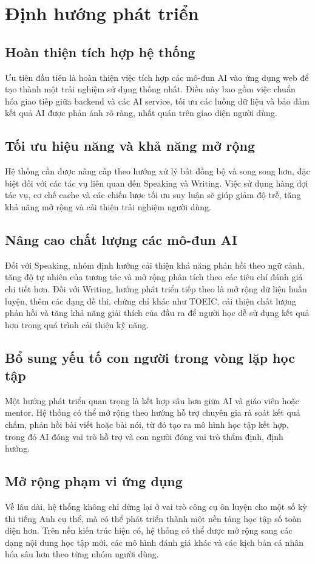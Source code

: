 \section{Định hướng phát triển}

\subsection{Hoàn thiện tích hợp hệ thống}
Ưu tiên đầu tiên là hoàn thiện việc tích hợp các mô-đun AI vào ứng dụng web để tạo thành một trải nghiệm sử dụng thống nhất. Điều này bao gồm việc chuẩn hóa giao tiếp giữa backend và các AI service, tối ưu các luồng dữ liệu và bảo đảm kết quả AI được phản ánh rõ ràng, nhất quán trên giao diện người dùng.

\subsection{Tối ưu hiệu năng và khả năng mở rộng}
Hệ thống cần được nâng cấp theo hướng xử lý bất đồng bộ và song song hơn, đặc biệt đối với các tác vụ liên quan đến Speaking và Writing. Việc sử dụng hàng đợi tác vụ, cơ chế cache và các chiến lược tối ưu suy luận sẽ giúp giảm độ trễ, tăng khả năng mở rộng và cải thiện trải nghiệm người dùng.

\subsection{Nâng cao chất lượng các mô-đun AI}
Đối với Speaking, nhóm định hướng cải thiện khả năng phản hồi theo ngữ cảnh, tăng độ tự nhiên của tương tác và mở rộng phân tích theo các tiêu chí đánh giá chi tiết hơn. Đối với Writing, hướng phát triển tiếp theo là mở rộng dữ liệu huấn luyện, thêm các dạng đề thi, chứng chỉ khác như TOEIC, cải thiện chất lượng phản hồi và tăng khả năng giải thích của đầu ra để người học dễ sử dụng kết quả hơn trong quá trình cải thiện kỹ năng.

\subsection{Bổ sung yếu tố con người trong vòng lặp học tập}
Một hướng phát triển quan trọng là kết hợp sâu hơn giữa AI và giáo viên hoặc mentor. Hệ thống có thể mở rộng theo hướng hỗ trợ chuyên gia rà soát kết quả chấm, phản hồi bài viết hoặc bài nói, từ đó tạo ra mô hình học tập kết hợp, trong đó AI đóng vai trò hỗ trợ và con người đóng vai trò thẩm định, định hướng.

\subsection{Mở rộng phạm vi ứng dụng}
Về lâu dài, hệ thống không chỉ dừng lại ở vai trò công cụ ôn luyện cho một số kỳ thi tiếng Anh cụ thể, mà có thể phát triển thành một nền tảng học tập số toàn diện hơn. Trên nền kiến trúc hiện có, hệ thống có thể được mở rộng sang các dạng nội dung học tập mới, các mô hình đánh giá khác và các kịch bản cá nhân hóa sâu hơn theo từng nhóm người dùng.

